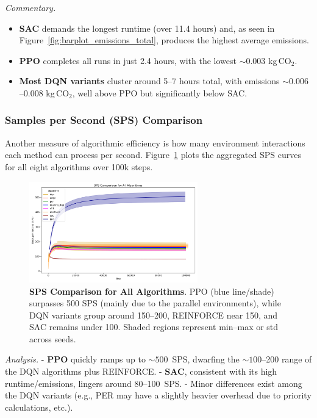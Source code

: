 \noindent
\emph{Commentary.}
\begin{itemize}
	\item \textbf{SAC} demands the longest runtime (over 11.4 hours) and, as seen in 
	Figure~\ref{fig:barplot_emissions_total}, produces the highest average emissions. 
	\item \textbf{PPO} completes all runs in just 2.4 hours, with the lowest \(\sim0.003\) 
	kg\,CO$_2$. 
	\item \textbf{Most DQN variants} cluster around 5--7 hours total, with emissions 
	\(\sim0.006\)--0.008 kg\,CO$_2$, well above PPO but significantly below SAC.
\end{itemize}

\subsubsection{Samples per Second (SPS) Comparison}
Another measure of algorithmic efficiency is how many environment interactions each method 
can process per second. Figure~\ref{fig:sps_all} plots the aggregated SPS curves for all 
eight algorithms over 100k steps.

\begin{figure}[htbp]
	\centering
	\includegraphics[width=0.65\textwidth]{figures/comparison/sps_all.png}
	\caption{\textbf{SPS Comparison for All Algorithms}. PPO (blue line/shade) surpasses 
		500 SPS (mainly due to the parallel environments), while DQN variants group around 150--200, REINFORCE near 150, and SAC remains 
		under 100. Shaded regions represent min--max or std across seeds.}
	\label{fig:sps_all}
\end{figure}

\noindent
\emph{Analysis.} 
- \textbf{PPO} quickly ramps up to $\sim500$~SPS, dwarfing the $\sim100$--200 range of the DQN 
algorithms plus REINFORCE. 
- \textbf{SAC}, consistent with its high runtime/emissions, lingers around 80--100~SPS. 
- Minor differences exist among the DQN variants (e.g., PER may have a slightly heavier overhead 
due to priority calculations, etc.).

